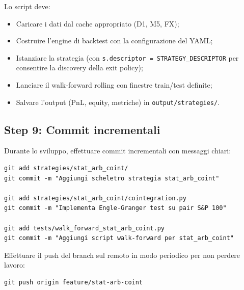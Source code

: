 Lo script deve:

\begin{itemize}
  \item Caricare i dati dal cache appropriato (D1, M5, FX);
  \item Costruire l'engine di backtest con la configurazione del YAML;
  \item Istanziare la strategia (con \texttt{s.descriptor = STRATEGY\_DESCRIPTOR} per consentire la discovery della exit policy);
  \item Lanciare il walk-forward rolling con finestre train/test definite;
  \item Salvare l'output (PnL, equity, metriche) in \texttt{output/strategies/}.
\end{itemize}

\subsection{Step 9: Commit incrementali}

Durante lo sviluppo, effettuare commit incrementali con messaggi chiari:

\begin{lstlisting}
git add strategies/stat_arb_coint/
git commit -m "Aggiungi scheletro strategia stat_arb_coint"

git add strategies/stat_arb_coint/cointegration.py
git commit -m "Implementa Engle-Granger test su pair S&P 100"

git add tests/walk_forward_stat_arb_coint.py
git commit -m "Aggiungi script walk-forward per stat_arb_coint"
\end{lstlisting}

Effettuare il push del branch sul remoto in modo periodico per non perdere lavoro:

\begin{lstlisting}
git push origin feature/stat-arb-coint
\end{lstlisting}
